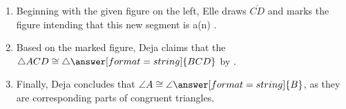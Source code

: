 \documentclass[nooutcomes]{ximera}
\begin{document}
\begin{problem}
\begin{enumerate}
\item Beginning with the given figure on the left, Elle draws $\overline{CD}$ and marks the figure intending that this new segment is a(n) .

\item Based on the marked figure, Deja claims that the $\triangle ACD\cong \triangle\answer[format=string]{BCD}$ by . 

\item Finally, Deja concludes that $\angle A\cong \angle\answer[format=string]{B}$, as they are corresponding parts of congruent triangles. 
\end{enumerate}

\end{problem}
\end{document}

